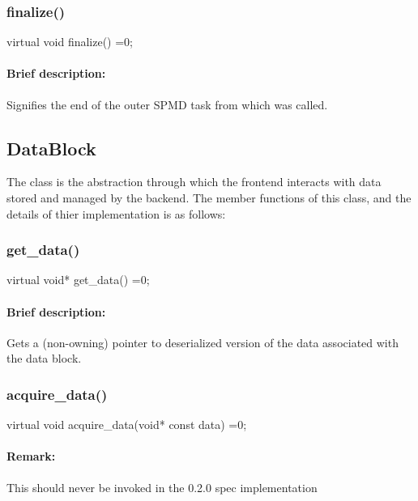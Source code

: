 \subsubsection{finalize()}
\begin{CppCode}
    virtual void
    finalize() =0;
\end{CppCode}

\paragraph{Brief description:} Signifies the end of the outer SPMD task from which  was called.
     



\subsection{{DataBlock}}

The  class is the abstraction through which the frontend interacts with data stored and managed by the backend. The 
member functions of this class, and the details of thier implementation is as follows:

\subsubsection{get\_data()}
\begin{CppCode}
    virtual void*
    get_data() =0;
\end{CppCode}

\paragraph{Brief description:} Gets a (non-owning) pointer to deserialized version of the data associated with
      the data block.


\subsubsection{acquire\_data()}
\begin{CppCode}
    virtual void
    acquire_data(void* const data) =0;
\end{CppCode}

\paragraph{Remark:} This should never be invoked in the 0.2.0 spec implementation


